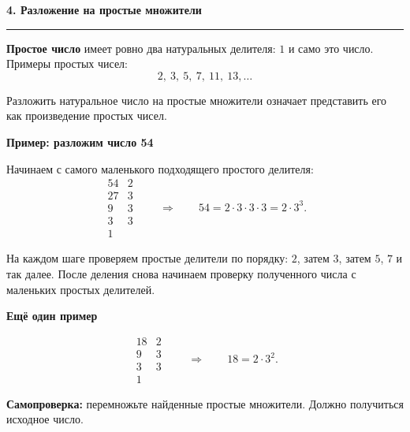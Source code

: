 \documentclass[a4paper,12pt]{article}
\newcommand{\sectiontitle}[1]{%
  \vspace{0.25em}%
  {\Large\bfseries\color{darkaccent}#1\par}%
  \vspace{0.3em}%
  {\color{linegray}\rule{\linewidth}{0.6pt}}%
  \vspace{0.5em}%
}
\newcommand{\subsectiontitle}[1]{%
  \vspace{0.2em}%
  {\large\bfseries\color{accent}#1\par}%
  \vspace{0.15em}%
}
\newcommand{\important}[1]{\textbf{\textcolor{darkaccent}{#1}}}
\begin{document}
\clearpage

\sectiontitle{4. Разложение на простые множители}

\important{Простое число} имеет ровно два натуральных делителя: $1$ и само это число. Примеры простых чисел:
\[
  2,\ 3,\ 5,\ 7,\ 11,\ 13,\ldots
\]

Разложить натуральное число на простые множители означает представить его как произведение простых чисел.

\subsectiontitle{Пример: разложим число 54}

Начинаем с самого маленького подходящего простого делителя:
\[
\begin{array}{r|l}
54&2\\
27&3\\
9&3\\
3&3\\
1&
\end{array}
\qquad\Longrightarrow\qquad
54=2\cdot3\cdot3\cdot3=2\cdot3^3.
\]

На каждом шаге проверяем простые делители по порядку: $2$, затем $3$, затем $5$, $7$ и так далее. После деления снова начинаем проверку полученного числа с маленьких простых делителей.

\subsectiontitle{Ещё один пример}

\[
\begin{array}{r|l}
18&2\\
9&3\\
3&3\\
1&
\end{array}
\qquad\Longrightarrow\qquad
18=2\cdot3^2.
\]

\important{Самопроверка:} перемножьте найденные простые множители. Должно получиться исходное число.

\clearpage
\thispagestyle{empty}
\end{document}
